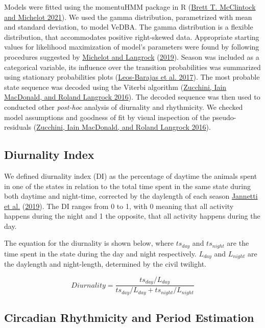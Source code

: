 \documentclass[english,msc,numbers,hidelinks]{coppe}
\begin{document}
  Models were fitted using the momentuHMM package in R (\protect\hyperlink{ref-mcclintock2021}{Brett T. McClintock and Michelot 2021}). We used the gamma distribution, parametrized with mean and standard deviation, to model VeDBA. The gamma distribution is a flexible distribution, that accommodates positive right-skewed data. Appropriate starting values for likelihood maximization of model's parameters were found by following procedures suggested by \protect\hyperlink{ref-michelot2019}{Michelot and Langrock} (\protect\hyperlink{ref-michelot2019}{2019}). Season was included as a categorical variable, its influence over the transition probabilities was summarized using stationary probabilities plots (\protect\hyperlink{ref-leosbarajas2017}{Leos-Barajas et al. 2017}). The most probable state sequence was decoded using the Viterbi algorithm (\protect\hyperlink{ref-zucchini2016}{Zucchini, Iain MacDonald, and Roland Langrock 2016}). The decoded sequence was then used to conducted other \emph{post-hoc} analysis of diurnality and rhythmicity. We checked model assumptions and goodness of fit by visual inspection of the pseudo-residuals (\protect\hyperlink{ref-zucchini2016}{Zucchini, Iain MacDonald, and Roland Langrock 2016}).

  \hypertarget{diurnality-index}{%
  \subsection{Diurnality Index}\label{diurnality-index}}

  We defined diurnality index (DI) as the percentage of daytime the animals spent in one of the states in relation to the total time spent in the same state during both daytime and night-time, corrected by the daylength of each season \protect\hyperlink{ref-jannetti2019}{Jannetti et al.} (\protect\hyperlink{ref-jannetti2019}{2019}). The DI ranges from 0 to 1, with 0 meaning that all activity happens during the night and 1 the opposite, that all activity happens during the day.

  The equation for the diurnality is shown below, where \(ts_{day}\) and \(ts_{night}\) are the time spent in the state during the day and night respectively. \(L_{day}\) and \(L_{night}\) are the daylength and night-length, determined by the civil twilight.

  \[
  Diurnality = \frac{ts_{day}/L_{day}}{ts_{day}/L_{day} + ts_{night}/L_{night}}
  \]

  \hypertarget{circadian-rhythmicity-and-period-estimation}{%
  \subsection{Circadian Rhythmicity and Period Estimation}\label{circadian-rhythmicity-and-period-estimation}}
\end{document}

